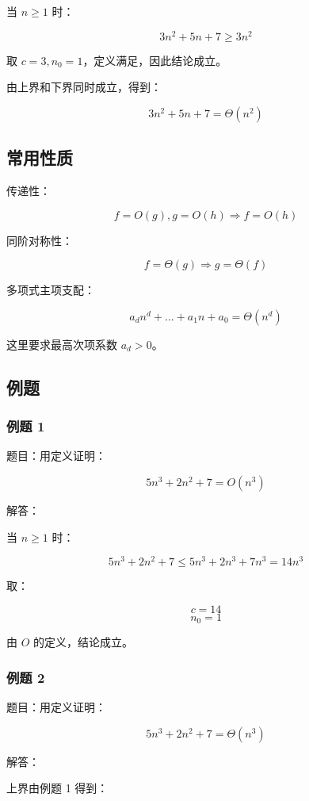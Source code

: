 \documentclass[UTF8,zihao=-4]{ctexart}
\begin{document}
当 $n \ge 1$ 时：

\[3n^{2} + 5n + 7 \ge  3n^{2}\]

取 $c = 3, n_0 = 1$，定义满足，因此结论成立。

由上界和下界同时成立，得到：

\[3n^{2} + 5n + 7 = \Theta(n^{2})\]

\subsection*{常用性质}

传递性：

\[f = O(g), g = O(h) \Rightarrow  f = O(h)\]

同阶对称性：

\[f = \Theta(g) \Rightarrow  g = \Theta(f)\]

多项式主项支配：

\[a_d n^{d} + ... + a_{1} n + a_{0} = \Theta(n^{d})\]

这里要求最高次项系数 $a_d > 0$。

\subsection*{例题}

\subsubsection*{例题 1}

题目：用定义证明：

\[5n^{3} + 2n^{2} + 7 = O(n^{3})\]

解答：

当 $n \ge 1$ 时：

\[5n^{3} + 2n^{2} + 7 \le  5n^{3} + 2n^{3} + 7n^{3} = 14n^{3}\]

取：

\[c = 14\]
\[n_{0} = 1\]

由 $O$ 的定义，结论成立。

\subsubsection*{例题 2}

题目：用定义证明：

\[5n^{3} + 2n^{2} + 7 = \Theta(n^{3})\]

解答：

上界由例题 1 得到：
\end{document}
